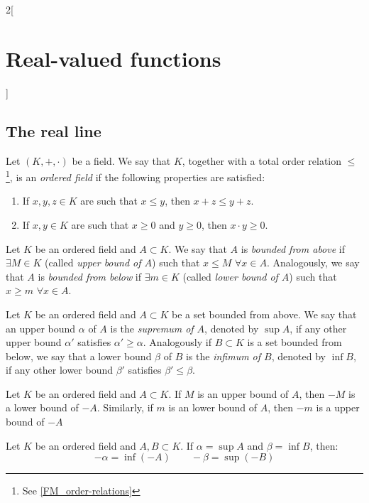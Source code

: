 \documentclass[../../../main.tex]{subfiles}
\begin{document}
\begin{multicols}{2}[\section{Real-valued functions}]
  \subsection{The real line}
  \begin{definition}
    Let $(K,+,\cdot)$ be a field. We say that $K$, together with a total order relation $\leq$\footnote{See \cref{FM_order-relations}}, is an \textit{ordered field} if the following properties are satisfied:
    \begin{enumerate}
      \item If $x,y,z\in K$ are such that $x\leq y$, then $x+z\leq y+z$.
      \item If $x,y\in K$ are such that $x\geq0$ and $y\geq0$, then $x\cdot y\geq 0$.
    \end{enumerate}
  \end{definition}
  \begin{definition}
    Let $K$ be an ordered field and $A\subset K$. We say that $A$ is \textit{bounded from above} if $\exists M\in K$ (called \textit{upper bound of $A$}) such that $x\leq M$ $\forall x\in A$. Analogously, we say that $A$ is \textit{bounded from below} if $\exists m\in K$ (called \textit{lower bound of $A$}) such that $x\geq m$ $\forall x\in A$.
  \end{definition}
  \begin{definition}
    Let $K$ be an ordered field and $A\subset K$ be a set bounded from above. We say that an upper bound $\alpha$ of $A$ is the \textit{supremum of $A$}, denoted by $\sup A$, if any other upper bound $\alpha'$ satisfies $\alpha'\geq\alpha$.
    Analogously if $B\subset K$ is a set bounded from below, we say that a lower bound $\beta$ of $B$ is the \textit{infimum of $B$}, denoted by $\inf B$, if any other lower bound $\beta'$ satisfies $\beta'\leq\beta$.
  \end{definition}
  \begin{prop}
    Let $K$ be an ordered field and $A\subset K$. If $M$ is an upper bound of $A$, then $-M$ is a lower bound of $-A$. Similarly, if $m$ is an lower bound of $A$, then $-m$ is a upper bound of $-A$
  \end{prop}
  \begin{prop}
    Let $K$ be an ordered field and $A,B\subset K$. If $\alpha=\sup A$ and $\beta=\inf B$, then: $$-\alpha=\inf(-A)\qquad-\beta=\sup(-B)$$

\end{prop}
\end{multicols}
\end{document}
